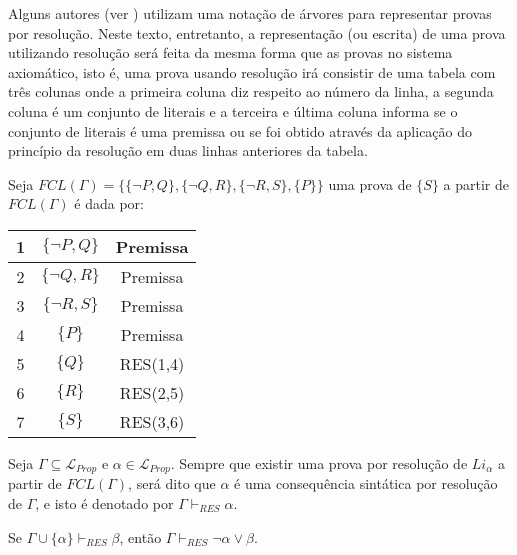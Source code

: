 Alguns autores (ver \cite{BenjaV1}) utilizam uma notação de árvores para representar provas por resolução. Neste texto, entretanto, a representação (ou escrita) de uma prova utilizando resolução será feita da mesma forma que as provas no sistema axiomático, isto é, uma prova usando resolução irá consistir de uma tabela com três colunas onde a primeira coluna diz respeito ao número da linha, a segunda coluna é um conjunto de literais e a terceira e última coluna informa se o conjunto de literais é uma premissa ou se foi obtido através da aplicação do princípio da resolução em duas linhas anteriores da tabela.

\begin{exem}
    Seja $FCL(\Gamma) = \{\{\neg P, Q\},\{\neg Q, R\}, \{\neg R, S\}, \{P\} \}$ uma prova de $\{S\}$ a partir de $FCL(\Gamma)$ é dada por:
    \begin{table}[ht]
        \centering
        \begin{tabular}{|c|c|c|}
            \hline
            1 & $\{\neg P, Q\}$ & Premissa \\ \hline
            2 & $\{\neg Q, R\}$ & Premissa \\ \hline
            3 & $\{\neg R, S\}$ & Premissa \\ \hline
            4 & $\{P\}$ & Premissa \\ \hline
            5 & $\{Q\}$ & RES(1,4) \\ \hline
            6 & $\{R\}$ & RES(2,5) \\ \hline
            7 & $\{S\}$ & RES(3,6) \\ \hline
        \end{tabular}
    \end{table}
\end{exem}


\begin{definition}
    Seja $\Gamma \subseteq \mathcal{L}_{Prop}$ e $\alpha \in \mathcal{L}_{Prop}$. Sempre que existir uma prova por resolução de $Li_{\alpha}$ a partir de $FCL(\Gamma)$, será dito que $\alpha$ é uma consequência sintática por resolução de $\Gamma$, e isto é denotado por $\Gamma \vdash_{RES} \alpha$.
\end{definition}

\begin{theorem}\label{teo:DeducaoResolucao}
    Se $\Gamma \cup \{\alpha\} \vdash_{RES} \beta$, então $\Gamma \vdash_{RES} \neg \alpha \lor \beta$.
\end{theorem}

